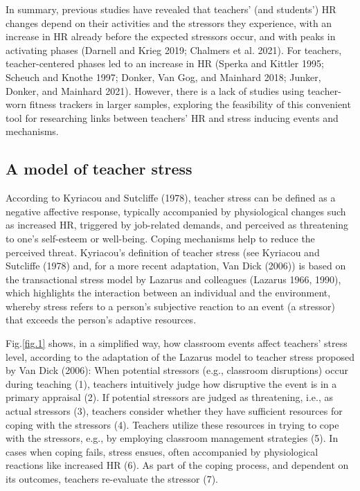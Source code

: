 \documentclass[preprint,
3p]{elsarticle} %
\begin{document}
In summary, previous studies have revealed that teachers' (and
students') HR changes depend on their activities and the stressors they
experience, with an increase in HR already before the expected stressors
occur, and with peaks in activating phases (Darnell and Krieg 2019;
Chalmers et al. 2021). For teachers, teacher-centered phases led to an
increase in HR (Sperka and Kittler 1995; Scheuch and Knothe 1997;
Donker, Van Gog, and Mainhard 2018; Junker, Donker, and Mainhard 2021).
However, there is a lack of studies using teacher-worn fitness trackers
in larger samples, exploring the feasibility of this convenient tool for
researching links between teachers' HR and stress inducing events and
mechanisms.

\subsection{A model of teacher stress}\label{a-model-of-teacher-stress}

According to Kyriacou and Sutcliffe (1978), teacher stress can be
defined as a negative affective response, typically accompanied by
physiological changes such as increased HR, triggered by job-related
demands, and perceived as threatening to one's self-esteem or
well-being. Coping mechanisms help to reduce the perceived threat.
Kyriacou's definition of teacher stress (see Kyriacou and Sutcliffe
(1978) and, for a more recent adaptation, Van Dick (2006)) is based on
the transactional stress model by Lazarus and colleagues (Lazarus 1966,
1990), which highlights the interaction between an individual and the
environment, whereby stress refers to a person's subjective reaction to
an event (a stressor) that exceeds the person's adaptive resources.

Fig.\ref{fig.1} shows, in a simplified way, how classroom events affect
teachers' stress level, according to the adaptation of the Lazarus model
to teacher stress proposed by Van Dick (2006): When potential stressors
(e.g., classroom disruptions) occur during teaching (1), teachers
intuitively judge how disruptive the event is in a primary appraisal
(2). If potential stressors are judged as threatening, i.e., as actual
stressors (3), teachers consider whether they have sufficient resources
for coping with the stressors (4). Teachers utilize these resources in
trying to cope with the stressors, e.g., by employing classroom
management strategies (5). In cases when coping fails, stress ensues,
often accompanied by physiological reactions like increased HR (6). As
part of the coping process, and dependent on its outcomes, teachers
re-evaluate the stressor (7).
\end{document}
